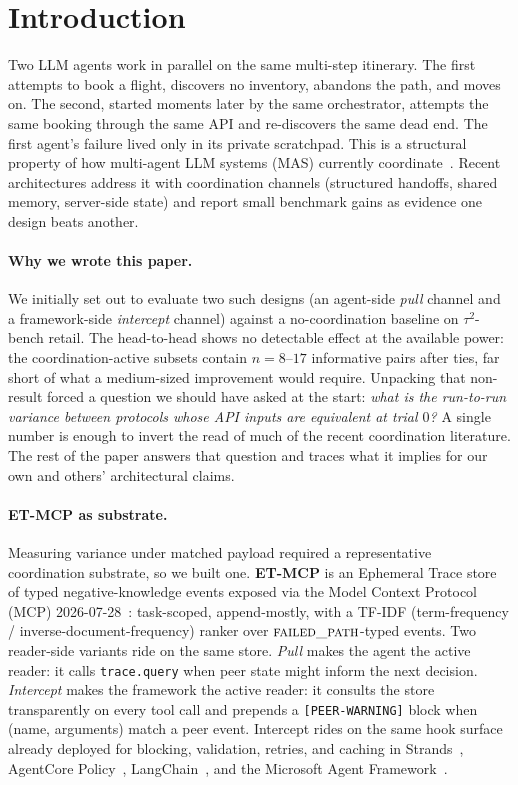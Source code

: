 \section{Introduction}
\label{sec:introduction}

Two LLM agents work in parallel on the same multi-step itinerary.
The first attempts to book a flight, discovers no inventory,
abandons the path, and moves on. The second, started moments
later by the same orchestrator, attempts the same booking
through the same API and re-discovers the same dead end. The
first agent's failure lived only in its private scratchpad. This
is a structural property of how multi-agent LLM systems (MAS)
currently coordinate~\cite{mast2025,codedelegator2026}. Recent
architectures address it with coordination channels (structured
handoffs, shared memory, server-side state) and report small
benchmark gains as evidence one design beats another.

\paragraph{Why we wrote this paper.}
We initially set out to evaluate two such designs (an
agent-side \emph{pull} channel and a framework-side
\emph{intercept} channel) against a no-coordination baseline on
$\tau^2$-bench retail. The head-to-head shows no detectable
effect at the available power: the coordination-active subsets
contain $n{=}8$--$17$ informative pairs after ties, far short of
what a medium-sized improvement would require. Unpacking that
non-result forced a question we should have asked at the start:
\emph{what is the run-to-run variance between protocols whose
API inputs are equivalent at trial $0$?} A single number is
enough to invert the read of much of the recent coordination
literature. The rest of the paper answers that question and
traces what it implies for our own and others' architectural
claims.

\paragraph{ET-MCP as substrate.}
Measuring variance under matched payload required a
representative coordination substrate, so we built one.
\textbf{ET-MCP} is an Ephemeral Trace store of typed
negative-knowledge events exposed via the Model Context Protocol
(MCP) 2026-07-28~\cite{mcpspec2026}: task-scoped, append-mostly,
with a TF-IDF (term-frequency / inverse-document-frequency)
ranker over $\textsc{failed\_path}$-typed events. Two reader-side
variants ride on the same store. \emph{Pull} makes the agent the
active reader: it calls \texttt{trace.query} when peer state
might inform the next decision. \emph{Intercept} makes the
framework the active reader: it consults the store transparently
on every tool call and prepends a \texttt{[PEER-WARNING]} block
when (name, arguments) match a peer event. Intercept rides on
the same hook surface already deployed for blocking, validation,
retries, and caching in
Strands~\cite{strandshooks2025}, AgentCore
Policy~\cite{agentcorepolicy2025},
LangChain~\cite{langchainmiddleware2026}, and the
Microsoft Agent Framework~\cite{msagentframework2026}.

